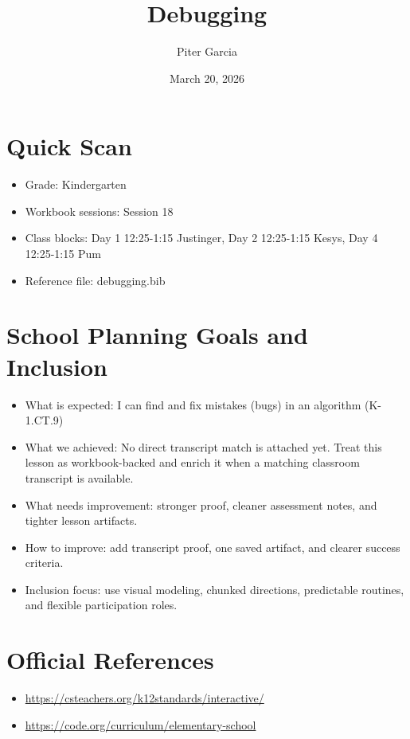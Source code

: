 \documentclass[11pt]{article}
\title{Debugging}
\author{Piter Garcia}
\date{March 20, 2026}
\begin{document}
    \maketitle
    \section*{Quick Scan}
    \begin{itemize}[leftmargin=*]
    \item Grade: Kindergarten
    \item Workbook sessions: Session 18
    \item Class blocks: Day 1 12:25-1:15 Justinger, Day 2 12:25-1:15 Kesys, Day 4 12:25-1:15 Pum
    \item Reference file: debugging.bib
    \end{itemize}
    \section*{School Planning Goals and Inclusion}
    \begin{itemize}[leftmargin=*]
    \item What is expected: I can find and fix mistakes (bugs) in an algorithm (K-1.CT.9)
    \item What we achieved: No direct transcript match is attached yet. Treat this lesson as workbook-backed and enrich it when a matching classroom transcript is available.
    \item What needs improvement: stronger proof, cleaner assessment notes, and tighter lesson artifacts.
    \item How to improve: add transcript proof, one saved artifact, and clearer success criteria.
    \item Inclusion focus: use visual modeling, chunked directions, predictable routines, and flexible participation roles.
    \end{itemize}
    \section*{Official References}
    \begin{itemize}[leftmargin=*]
    \item \url{https://csteachers.org/k12standards/interactive/}
\item \url{https://code.org/curriculum/elementary-school}

    \end{itemize}
    
\end{document}
